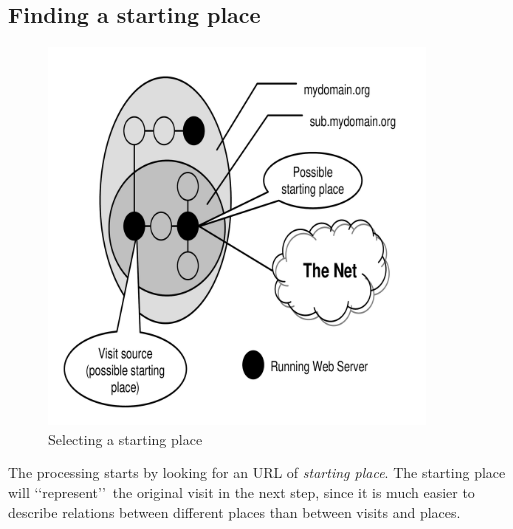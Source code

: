 \documentclass[a4paper]{danarticle}
\begin{document}
    \subsection*{Finding a starting place}
       \begin{figure}[ht]
       \centering
	 \includegraphics[width=10cm]{startingplace}
	 \caption{Selecting a starting place}
	 \label{startingplace}
       \end{figure}
       The processing starts by looking for an URL of \textit{starting place}. 
       The starting
       place will \lq\lq represent\rq\rq\ the original visit in the next step,
       since it is much easier to describe relations between different
       places than between visits and places.
       
\end{document}
